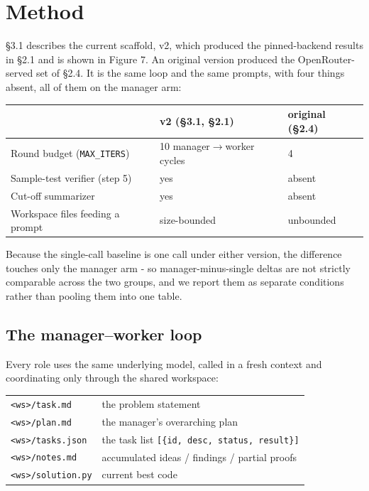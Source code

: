 \documentclass[11pt]{article}
\begin{document}
\section{Method}

\S3.1 describes the current scaffold, v2, which produced the pinned-backend results
in \S2.1 and is shown in Figure 7. An
original version produced the OpenRouter-served set of \S2.4. It is the same loop
and the same prompts, with four things absent, all of them on the manager arm:

\begin{center}
\small
\begin{tabular}{@{}lll@{}}
\toprule
& \textbf{v2 (\S3.1, \S2.1)} & \textbf{original (\S2.4)} \\
\midrule
Round budget (\texttt{MAX\_ITERS}) & 10 manager$\to$worker cycles & 4 \\
Sample-test verifier (step 5)      & yes                          & absent \\
Cut-off summarizer                 & yes                          & absent \\
Workspace files feeding a prompt   & size-bounded                 & unbounded \\
\bottomrule
\end{tabular}
\end{center}

Because the single-call baseline is one call under either version, the difference touches
only the manager arm - so manager-minus-single deltas are not strictly comparable across
the two groups, and we report them as separate conditions rather than pooling them into
one table.

\subsection{The manager--worker loop}

Every role uses the same underlying model, called in a fresh context and coordinating only
through the shared workspace:

\begin{center}
\small
\begin{tabular}{@{}ll@{}}
\texttt{<ws>/task.md}    & the problem statement \\
\texttt{<ws>/plan.md}    & the manager's overarching plan \\
\texttt{<ws>/tasks.json} & the task list \texttt{[\{id, desc, status, result\}]} \\
\texttt{<ws>/notes.md}   & accumulated ideas / findings / partial proofs \\
\texttt{<ws>/solution.py} & current best code \\
\end{tabular}
\end{center}
\end{document}

